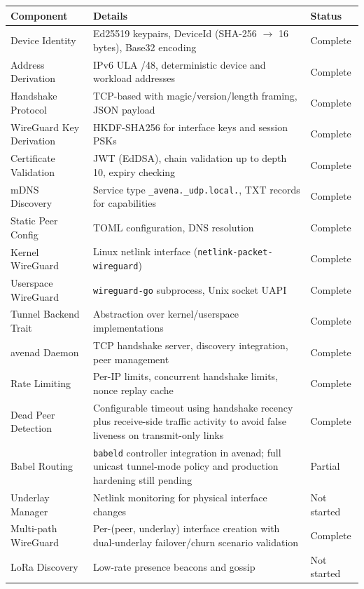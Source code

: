 \begin{longtable}{@{}p{4cm}p{6.5cm}p{2.5cm}@{}}
\toprule
\textbf{Component} & \textbf{Details} & \textbf{Status} \\
\midrule
\endhead
Device Identity & Ed25519 keypairs, DeviceId (SHA-256 $\rightarrow$ 16 bytes), Base32 encoding & Complete \\
Address Derivation & IPv6 ULA /48, deterministic device and workload addresses & Complete \\
Handshake Protocol & TCP-based with magic/version/length framing, JSON payload & Complete \\
WireGuard Key Derivation & HKDF-SHA256 for interface keys and session PSKs & Complete \\
Certificate Validation & JWT (EdDSA), chain validation up to depth 10, expiry checking & Complete \\
mDNS Discovery & Service type \texttt{\_avena.\_udp.local.}, TXT records for capabilities & Complete \\
Static Peer Config & TOML configuration, DNS resolution & Complete \\
Kernel WireGuard & Linux netlink interface (\texttt{netlink-packet-wireguard}) & Complete \\
Userspace WireGuard & \texttt{wireguard-go} subprocess, Unix socket UAPI & Complete \\
Tunnel Backend Trait & Abstraction over kernel/userspace implementations & Complete \\
avenad Daemon & TCP handshake server, discovery integration, peer management & Complete \\
Rate Limiting & Per-IP limits, concurrent handshake limits, nonce replay cache & Complete \\
Dead Peer Detection & Configurable timeout using handshake recency plus receive-side traffic activity to avoid false liveness on transmit-only links & Complete \\
\midrule
Babel Routing & \texttt{babeld} controller integration in avenad; full unicast tunnel-mode policy and production hardening still pending & Partial \\
Underlay Manager & Netlink monitoring for physical interface changes & Not started \\
Multi-path WireGuard & Per-(peer, underlay) interface creation with dual-underlay failover/churn scenario validation & Complete \\
LoRa Discovery & Low-rate presence beacons and gossip & Not started \\

\end{longtable}
